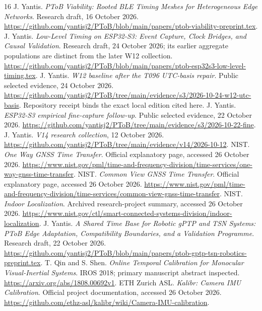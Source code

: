 \documentclass[11pt,letterpaper]{article}
\begin{document}
\begin{thebibliography}{16}\small\setlength{\itemsep}{4pt}
 J. Yantis. \emph{PToB Viability: Rooted BLE Timing Meshes for Heterogeneous Edge Networks}. Research draft, 16 October 2026. \url{https://github.com/yantisj2/PToB/blob/main/papers/ptob-viability-preprint.tex}.
 J. Yantis. \emph{Low-Level Timing on ESP32-S3: Event Capture, Clock Bridges, and Causal Validation}. Research draft, 24 October 2026; its earlier aggregate populations are distinct from the later W12 collection. \url{https://github.com/yantisj2/PToB/blob/main/papers/ptob-esp32s3-low-level-timing.tex}.
 J. Yantis. \emph{W12 baseline after the T096 UTC-basis repair}. Public selected evidence, 24 October 2026. \url{https://github.com/yantisj2/PToB/tree/main/evidence/s3/2026-10-24-w12-utc-basis}. Repository receipt binds the exact local edition cited here.
 J. Yantis. \emph{ESP32-S3 empirical fine-capture follow-up}. Public selected evidence, 22 October 2026. \url{https://github.com/yantisj2/PToB/tree/main/evidence/s3/2026-10-22-fine}.
 J. Yantis. \emph{V14 research collection}, 12 October 2026. \url{https://github.com/yantisj2/PToB/tree/main/evidence/v14/2026-10-12}.
 NIST. \emph{One Way GNSS Time Transfer}. Official explanatory page, accessed 26 October 2026. \url{https://www.nist.gov/pml/time-and-frequency-division/time-services/one-way-gnss-time-transfer}.
 NIST. \emph{Common View GNSS Time Transfer}. Official explanatory page, accessed 26 October 2026. \url{https://www.nist.gov/pml/time-and-frequency-division/time-services/common-view-gnss-time-transfer}.
 NIST. \emph{Indoor Localization}. Archived research-project summary, accessed 26 October 2026. \url{https://www.nist.gov/ctl/smart-connected-systems-division/indoor-localization}.
 J. Yantis. \emph{A Shared Time Base for Robotic gPTP and TSN Systems: PToB Edge Adaptation, Compatibility Boundaries, and a Validation Programme}. Research draft, 22 October 2026. \url{https://github.com/yantisj2/PToB/blob/main/papers/ptob-gptp-tsn-robotics-preprint.tex}.
 T. Qin and S. Shen. \emph{Online Temporal Calibration for Monocular Visual-Inertial Systems}. IROS 2018; primary manuscript abstract inspected. \url{https://arxiv.org/abs/1808.00692v1}.
 ETH Zurich ASL. \emph{Kalibr: Camera IMU Calibration}. Official project documentation, accessed 26 October 2026. \url{https://github.com/ethz-asl/kalibr/wiki/Camera-IMU-calibration}.

\end{thebibliography}
\end{document}
